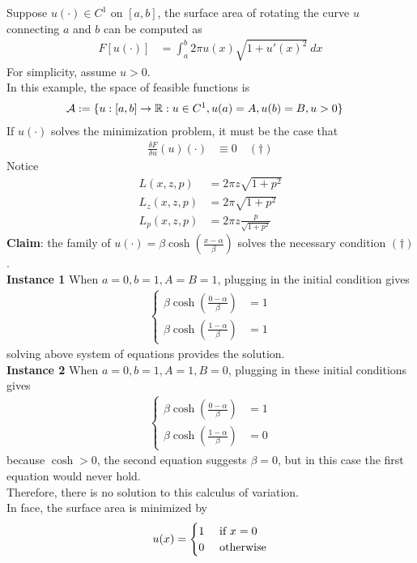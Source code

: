 \documentclass{article}
\begin{document}
	\begin{example}
		Suppose $u(\cdot) \in C^1$ on $[a, b]$, the surface area of rotating the curve $u$ connecting $a$ and $b$ can be computed as
		\begin{align}
			F[u(\cdot)] &= \int_a^b 2\pi u(x) \sqrt{1 + u'(x)^2}\ dx
		\end{align}
		For simplicity, assume $u > 0$. \\
		In this example, the space of feasible functions is 
		\begin{align}
			\mathcal{{A}} &:= \{u: [a, b] \to \mathbb{R}: u \in C^1, u(a) = A, u(b) = B, u > 0\}
		\end{align}
		If $u(\cdot)$ solves the minimization problem, it must be the case that
		\begin{align}
			\frac{\delta F}{\delta u}(u)(\cdot) &\equiv 0\quad (\dagger)
		\end{align}
		Notice
		\begin{align}
			L(x, z, p) &= 2 \pi z \sqrt{1 + p^2} \\
			L_z(x, z, p) &= 2 \pi \sqrt{1 + p^2} \\
			L_p(x, z, p) &= 2 \pi z \frac{p}{\sqrt{1 + p^2}}
		\end{align}
		\textbf{Claim}: the family of $u(\cdot) = \beta \cosh \left(\frac{x-\alpha}{\beta}\right)$ solves the necessary condition $(\dagger)$. \\
		\textbf{Instance 1} When $a=0, b=1, A=B=1$, plugging in the initial condition gives
		\begin{align}
			\begin{cases}
				\beta \cosh \left(\frac{0-\alpha}{\beta}\right) &= 1 \\
				\beta \cosh \left(\frac{1-\alpha}{\beta}\right) &= 1
			\end{cases}
		\end{align}
		solving above system of equations provides the solution. \\
		\textbf{Instance 2} When $a=0, b=1, A=1, B=0$, plugging in these initial conditions gives
		\begin{align}
			\begin{cases}
				\beta \cosh \left(\frac{0-\alpha}{\beta}\right) &= 1 \\
				\beta \cosh \left(\frac{1-\alpha}{\beta}\right) &= 0
			\end{cases}
		\end{align}
		because $\cosh > 0$, the second equation suggests $\beta=0$, but in this case the first equation would never hold. \\
		Therefore, there is no solution to this calculus of variation. \\
		In face, the surface area is minimized by
		\begin{align}
			u(x) = \begin{cases}
				1 &\text{{ if }} x = 0 \\
				0 &\text{{ otherwise}}
			\end{cases}
		\end{align}
	\end{example}
	
\end{document}
